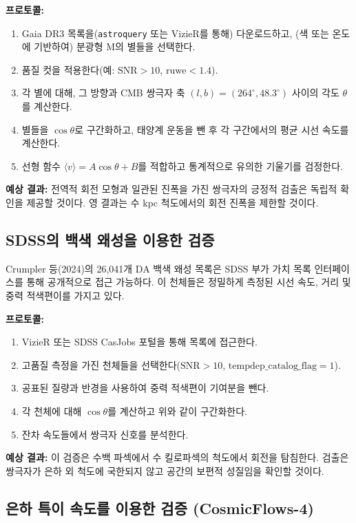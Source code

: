 \documentclass[11pt,a4paper]{article}
\begin{document}
	\textbf{프로토콜:}
	\begin{enumerate}
		\item Gaia DR3 목록을(\texttt{astroquery} 또는 VizieR를 통해) 다운로드하고, (색 또는 온도에 기반하여) 분광형 M의 별들을 선택한다.
		\item 품질 컷을 적용한다(예: \(\mathrm{SNR} > 10\), \(\mathrm{ruwe} < 1.4\)).
		\item 각 별에 대해, 그 방향과 CMB 쌍극자 축 \((l,b) = (264^\circ, 48.3^\circ)\) 사이의 각도 \(\theta\)를 계산한다.
		\item 별들을 \(\cos\theta\)로 구간화하고, 태양계 운동을 뺀 후 각 구간에서의 평균 시선 속도를 계산한다.
		\item 선형 함수 \(\langle v \rangle = A \cos\theta + B\)를 적합하고 통계적으로 유의한 기울기를 검정한다.
	\end{enumerate}
	
	\textbf{예상 결과:} 전역적 회전 모형과 일관된 진폭을 가진 쌍극자의 긍정적 검출은 독립적 확인을 제공할 것이다. 영 결과는 수 kpc 척도에서의 회전 진폭을 제한할 것이다.
	
	\subsection{SDSS의 백색 왜성을 이용한 검증}
	
	Crumpler 등(2024)의 26,041개 DA 백색 왜성 목록은 SDSS 부가 가치 목록 인터페이스를 통해 공개적으로 접근 가능하다. 이 천체들은 정밀하게 측정된 시선 속도, 거리 및 중력 적색편이를 가지고 있다.
	
	\textbf{프로토콜:}
	\begin{enumerate}
		\item VizieR 또는 SDSS CasJobs 포털을 통해 목록에 접근한다.
		\item 고품질 측정을 가진 천체들을 선택한다(\(\mathrm{SNR} > 10\), \(\mathrm{tempdep\_catalog\_flag} = 1\)).
		\item 공표된 질량과 반경을 사용하여 중력 적색편이 기여분을 뺀다.
		\item 각 천체에 대해 \(\cos\theta\)를 계산하고 위와 같이 구간화한다.
		\item 잔차 속도들에서 쌍극자 신호를 분석한다.
	\end{enumerate}
	
	\textbf{예상 결과:} 이 검증은 수백 파섹에서 수 킬로파섹의 척도에서 회전을 탐침한다. 검출은 쌍극자가 은하 외 척도에 국한되지 않고 공간의 보편적 성질임을 확인할 것이다.
	
	\subsection{은하 특이 속도를 이용한 검증 (CosmicFlows-4)}
	
\end{document}
